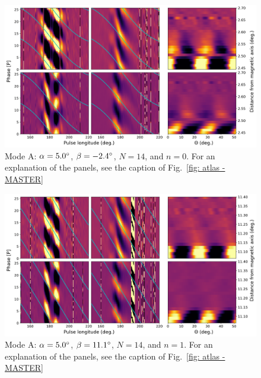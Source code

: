 \begin{figure}
	\begin{center}
		\includegraphics[width=\atlasHeightFrac\textwidth]{Figures/B0031/atlas/A_517005014000_plots}
		\caption[Atlas results: Mode A -- $\alpha=5.0\degr$, $\beta=-2.4\degr$, $N=14$, $n=0$]{Mode A: $\alpha=5.0\degr$, $\beta=-2.4\degr$, $N=14$, and $n=0$. For an explanation of the panels, see the caption of Fig.~\ref{fig: atlas - MASTER} }
		\label{fig: atlas - A_517005014000}
	\end{center}
\end{figure}

\begin{figure}
	\begin{center}
		\includegraphics[width=\atlasHeightFrac\textwidth]{Figures/B0031/atlas/A_517005014001_plots}
		\caption[Atlas results: Mode A -- $\alpha=5.0\degr$, $\beta=11.1\degr$, $N=14$, $n=1$]{Mode A: $\alpha=5.0\degr$, $\beta=11.1\degr$, $N=14$, and $n=1$. For an explanation of the panels, see the caption of Fig.~\ref{fig: atlas - MASTER} }
		\label{fig: atlas - A_517005014001}
	\end{center}
\end{figure}

